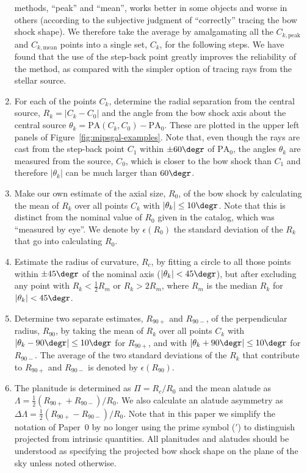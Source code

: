 \begin{enumerate}[1.]
  methods, ``peak'' and ``mean'', works better in some objects and
  worse in others (according to the subjective judgment of
  ``correctly'' tracing the bow shock shape).  We therefore take the
  average by amalgamating all the \(C_{k,\text{peak}}\) and
  \(C_{k,\text{mean}}\) points into a single set, \(C_{k}\), for the
  following steps.  We have found that the use of the step-back point
  greatly improves the reliability of the method, as compared with the
  simpler option of tracing rays from the stellar source.
\item For each of the points \(C_{k}\), determine the radial
  separation from the central source, \(R_k = |C_k - C_0|\) and the
  angle from the bow shock axis about the central source
  \(\theta_k = \text{PA}(C_k, C_0) - \text{PA}_0\).  These are plotted in
  the upper left panels of Figure~\ref{fig:mipsgal-examples}.  Note
  that, even though the rays are cast from the step-back point \(C_1\)
  within \(\pm 60\degr\) of \(\text{PA}_0\), the angles \(\theta_k\) are
  measured from the source, \(C_0\), which is closer to the bow shock
  than \(C_1\) and therefore \(|\theta_k|\) can be much larger than
  \(60\degr\).
\item Make our own estimate of the axial size, \(R_0\), of the bow
  shock by calculating the mean of \(R_k\) over all points \(C_k\)
  with \(|\theta_k| \le 10\degr\).  Note that this is distinct from the
  nominal value of \(R_0\) given in the \citet{Kobulnicky:2016a}
  catalog, which was ``measured by eye''.  We denote by
  \(\epsilon(R_0)\) the standard deviation of the \(R_k\) that go into
  calculating \(R_0\).\label{step:R0}
\item Estimate the radius of curvature, \(R_c\), by fitting a circle
  to all those points within \(\pm 45\degr\) of the nominal axis
  (\(|\theta_k| < 45\degr\)), but after excluding any point with
  \(R_k < \frac12 R_m\) or \(R_k > 2 R_m\), where \(R_m\) is the median
  \(R_k\) for \(|\theta_k| < 45\degr\).\label{step:Rc}
\item Determine two separate estimates, \(R_{90+}\) and \(R_{90-}\),
  of the perpendicular radius, \(R_{90}\), by taking the mean of
  \(R_k\) over all points \(C_k\) with
  \(|\theta_k - 90\degr| \le 10\degr\) for \(R_{90+}\), and with
  \(|\theta_k + 90\degr| \le 10\degr\) for \(R_{90-}\).  The average of the
  two standard deviations of the \(R_k\) that contribute to
  \(R_{90+}\) and \(R_{90-}\) is denoted by \(\epsilon(R_{90})\).\label{step:R90}
\item The planitude is determined as \(\Pi = R_c / R_0\) and the mean
  alatude as \(\Lambda = \frac12 (R_{90+} + R_{90-}) / R_0\).  We also
  calculate an alatude asymmetry as
  \(\Delta\Lambda = \frac12 (R_{90+} - R_{90-}) / R_0\). Note that in this paper
  we simplify the notation of Paper~0 by no longer using the prime
  symbol (\('\)) to distinguish projected from intrinsic quantities.
  All planitudes and alatudes should be understood as specifying the
  projected bow shock shape on the plane of the sky unless noted
  otherwise.\label{step:Pi-Lambda}
\end{enumerate}
